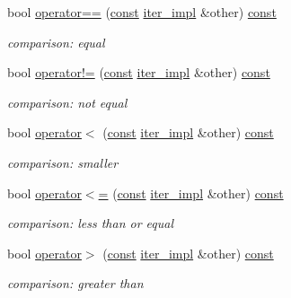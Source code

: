 \begin{DoxyCompactItemize}
bool \hyperlink{classnlohmann_1_1detail_1_1iter__impl_abe91c77d1be747fadcbfaf6f685e3ee7}{operator==} (\hyperlink{functions__c_8js_afacfd9c985d225bb07483b887a801b6f}{const} \hyperlink{classnlohmann_1_1detail_1_1iter__impl}{iter\+\_\+impl} \&other) \hyperlink{functions__c_8js_afacfd9c985d225bb07483b887a801b6f}{const} 
\begin{DoxyCompactList}\small\item\em comparison\+: equal \end{DoxyCompactList}\item 
bool \hyperlink{classnlohmann_1_1detail_1_1iter__impl_a66af27bbbf9743bc000264a0f89c5d0d}{operator!=} (\hyperlink{functions__c_8js_afacfd9c985d225bb07483b887a801b6f}{const} \hyperlink{classnlohmann_1_1detail_1_1iter__impl}{iter\+\_\+impl} \&other) \hyperlink{functions__c_8js_afacfd9c985d225bb07483b887a801b6f}{const} 
\begin{DoxyCompactList}\small\item\em comparison\+: not equal \end{DoxyCompactList}\item 
bool \hyperlink{classnlohmann_1_1detail_1_1iter__impl_a3a5123a4cfe72a9d674c9ff65c4ec08c}{operator$<$} (\hyperlink{functions__c_8js_afacfd9c985d225bb07483b887a801b6f}{const} \hyperlink{classnlohmann_1_1detail_1_1iter__impl}{iter\+\_\+impl} \&other) \hyperlink{functions__c_8js_afacfd9c985d225bb07483b887a801b6f}{const} 
\begin{DoxyCompactList}\small\item\em comparison\+: smaller \end{DoxyCompactList}\item 
bool \hyperlink{classnlohmann_1_1detail_1_1iter__impl_aa90b4d1da290b5073778e295dc2985f3}{operator$<$=} (\hyperlink{functions__c_8js_afacfd9c985d225bb07483b887a801b6f}{const} \hyperlink{classnlohmann_1_1detail_1_1iter__impl}{iter\+\_\+impl} \&other) \hyperlink{functions__c_8js_afacfd9c985d225bb07483b887a801b6f}{const} 
\begin{DoxyCompactList}\small\item\em comparison\+: less than or equal \end{DoxyCompactList}\item 
bool \hyperlink{classnlohmann_1_1detail_1_1iter__impl_afe8894bea0a0b616d9d5975ca04e8b39}{operator$>$} (\hyperlink{functions__c_8js_afacfd9c985d225bb07483b887a801b6f}{const} \hyperlink{classnlohmann_1_1detail_1_1iter__impl}{iter\+\_\+impl} \&other) \hyperlink{functions__c_8js_afacfd9c985d225bb07483b887a801b6f}{const} 
\begin{DoxyCompactList}\small\item\em comparison\+: greater than \end{DoxyCompactList}\item 

\end{DoxyCompactItemize}
